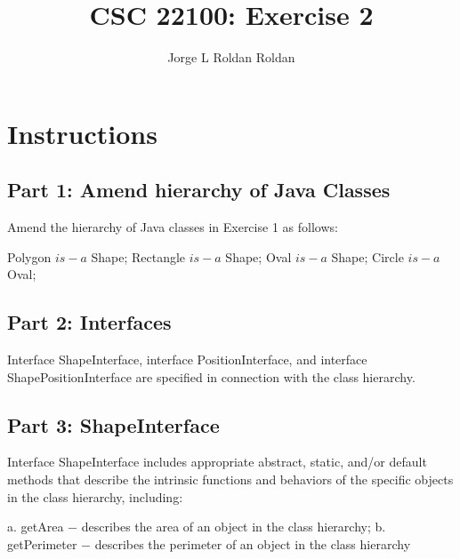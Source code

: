 \documentclass[a4paper,12pt]{article}
\title{CSC 22100: Exercise 2}
\begin{document}
\newpage

\author{Jorge L Roldan Roldan}
\maketitle

\tableofcontents


\pagebreak
\listoffigures

\newpage
\section{Instructions}

\subsection{Part 1: Amend hierarchy of Java Classes}


\vspace{0.25cm}
Amend the hierarchy of Java classes in Exercise 1 as follows:
\vspace{0.25cm}


Polygon $is-a$ Shape; \newline
Rectangle $is-a$ Shape;  \newline
Oval $is-a$ Shape;  \newline
Circle $is-a$ Oval;  \newline

\subsection{Part 2: Interfaces}

Interface ShapeInterface, interface PositionInterface, and interface ShapePositionInterface are specified in connection with the class hierarchy.

\subsection{Part 3: ShapeInterface}


Interface ShapeInterface includes appropriate abstract, static, and/or default methods that describe the intrinsic functions and behaviors of the specific objects in the class hierarchy, including:

a. getArea $-$ describes the area of an object in the class hierarchy; \newline
b. getPerimeter $-$ describes the perimeter of an object in the class hierarchy \newline
\end{document}
